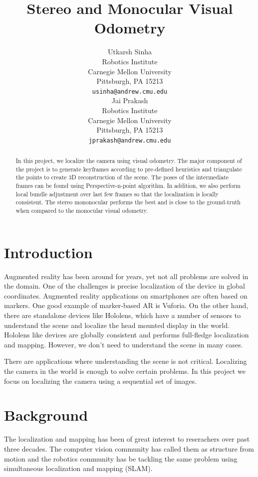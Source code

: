 \documentclass{article}
\title{Stereo and Monocular Visual Odometry}
\author{
 Utkarsh Sinha \\
  Robotics Institute\\
 Carnegie Mellon University \\
 Pittsburgh, PA 15213\\
  \texttt{usinha@andrew.cmu.edu} \\
\And
  Jai Prakash\\
  Robotics Institute\\
  Carnegie Mellon University\\
  Pittsburgh, PA 15213\\
  \texttt{jprakash@andrew.cmu.edu} \\
}
\begin{document}

\maketitle

\begin{abstract}
In this project, we localize the camera using visual odometry. The major component of the project is to generate keyframes according to pre-defined heuristics and triangulate the points to create 3D reconstruction of the scene. The poses of the intermediate frames can be found using Perspective-n-point algorithm. In addition, we also perform local bundle adjustment over last few frames so that the localization is locally consistent. The stereo mononocular performs the best and is close to the ground-truth when compared to the monocular visual odometry. 
\end{abstract}

\section{Introduction}

Augmented reality has been around for years, yet not all problems are solved in the domain. One of the challenges is precise localization of the device in global coordinates. Augmented reality applications on smartphones are often based on markers. One good example of marker-based AR is Vuforia. On the other hand, there are standalone devices like Hololens, which have a number of sensors to understand the scene and localize the head mounted display in the world. Hololens like devices are globally consistent and performs full-fledge localization and mapping. However, we don't need to understand the scene in many cases.

There are applications where understanding the scene is not critical. Localizing the camera in the world is enough to solve certain problems. In this project we focus on localizing the camera using a sequential set of images.


\section{Background}
The localization and mapping has been of great interest to reserachers over past three decades. The computer vision community has called them as structure from motion and the robotics community has be tackling the same problem using simultaneous localization and mapping (SLAM).
\end{document}
